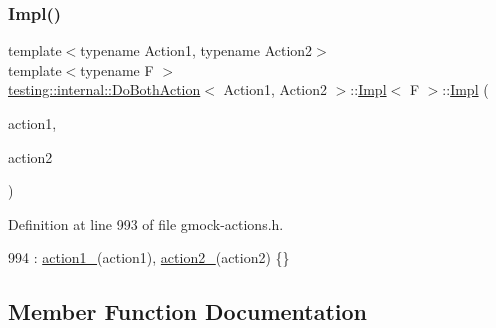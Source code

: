 \subsubsection{\texorpdfstring{Impl()}{Impl()}}
{\footnotesize\ttfamily template$<$typename Action1, typename Action2$>$ \\
template$<$typename F $>$ \\
\hyperlink{classtesting_1_1internal_1_1DoBothAction}{testing\+::internal\+::\+Do\+Both\+Action}$<$ Action1, Action2 $>$\+::\hyperlink{classtesting_1_1internal_1_1DoBothAction_1_1Impl}{Impl}$<$ F $>$\+::\hyperlink{classtesting_1_1internal_1_1DoBothAction_1_1Impl}{Impl} (\begin{DoxyParamCaption}\item[{const \hyperlink{classtesting_1_1Action}{Action}$<$ \hyperlink{classtesting_1_1internal_1_1DoBothAction_1_1Impl_a83909f0d1addcd1207ff45b128f33802}{Void\+Result} $>$ \&}]{action1,  }\item[{const \hyperlink{classtesting_1_1Action}{Action}$<$ F $>$ \&}]{action2 }\end{DoxyParamCaption})\hspace{0.3cm}{\ttfamily [inline]}}



Definition at line 993 of file gmock-\/actions.\+h.


\begin{DoxyCode}
994         : \hyperlink{classtesting_1_1internal_1_1DoBothAction_1_1Impl_af54fe7ce6f362c7ecae828804d18039a}{action1\_}(action1), \hyperlink{classtesting_1_1internal_1_1DoBothAction_1_1Impl_af1f725e8d028c532c07ee606df35dc44}{action2\_}(action2) \{\}
\end{DoxyCode}


\subsection{Member Function Documentation}
\mbox{\label{classtesting_1_1internal_1_1DoBothAction_1_1Impl_a2c00537668b40a1e05f131c3d8e4e88b}} 
